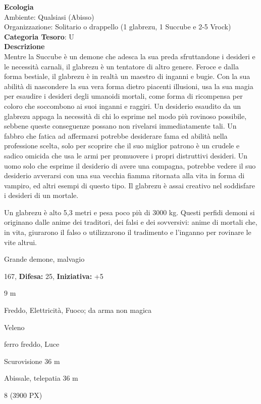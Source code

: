 \begin{multicols}{2}
{\textbf{Ecologia}\\
Ambiente: Qualsiasi (Abisso)\\
Organizzazione: Solitario o drappello (1 glabrezu, 1 Succube e 2-5 Vrock)
\textbf{Categoria Tesoro}: U\\
\textbf{Descrizione}\\
Mentre la Succube è un demone che adesca la sua preda sfruttandone i desideri e le necessità carnali, il glabrezu è un tentatore di altro genere. Feroce e dalla forma bestiale, il glabrezu è in realtà un maestro di inganni e bugie. Con la sua abilità di nascondere la sua vera forma dietro piacenti illusioni, usa la sua magia per esaudire i desideri degli umanoidi mortali, come forma di ricompensa per coloro che soccombono ai suoi inganni e raggiri. Un desiderio esaudito da un glabrezu appaga la necessità di chi lo esprime nel modo più rovinoso possibile, sebbene queste conseguenze possano non rivelarsi immediatamente tali. Un fabbro che fatica ad affermarsi potrebbe desiderare fama ed abilità nella professione scelta, solo per scoprire che il suo miglior patrono è un crudele e sadico omicida che usa le armi per promuovere i propri distruttivi desideri. Un uomo solo che esprime il desiderio di avere una compagna, potrebbe vedere il suo desiderio avverarsi con una sua vecchia fiamma ritornata alla vita in forma di vampiro, ed altri esempi di questo tipo. Il glabrezu è assai creativo nel soddisfare i desideri di un mortale.

Un glabrezu è alto 5,3 metri e pesa poco più di 3000 kg. Questi perfidi demoni si originano dalle anime dei traditori, dei falsi e dei sovversivi: anime di mortali che, in vita, giurarono il falso o utilizzarono il tradimento e l'inganno per rovinare le vite altrui.

\noindent
\begin{description}[noitemsep, topsep=0pt, parsep=0pt, partopsep=0pt, leftmargin=0cm, labelwidth=2.2cm]
	\item[\textbf{Taglia/Tipo:}] Grande demone, malvagio
	\item[\textbf{Caratt.:}] 
	\item[\textbf{Punti Ferita:}] 167,  \textbf{Difesa:} 25,  \textbf{Iniziativa:} +5
	\item[\textbf{Movimento:}] 9 m
	\item[\textbf{Tiri Salvez.:}] 
	\item[\textbf{Res. Danni:}] Freddo, Elettricità, Fuoco; da arma non magica
	\item[\textbf{Imm. Danni:}] Veleno
	\item[\textbf{Vulnerabilità:}] ferro freddo, Luce
	\item[\textbf{Sensi:}] Scurovisione 36 m
	\item[\textbf{Linguaggi:}] Abissale, telepatia 36 m
	\item[\textbf{Sfida:}] 8 (3900 PX)\smallskip
\end{description}

}
\end{multicols}

